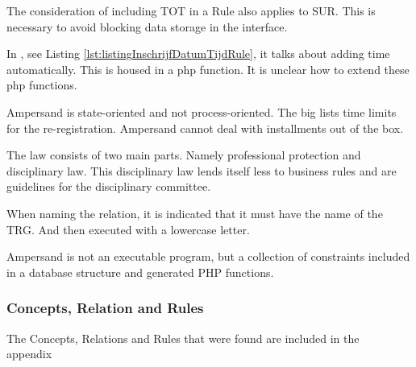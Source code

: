 The consideration of including TOT in a Rule also applies to SUR.
This is necessary to avoid blocking data storage in the interface.

In , see Listing \ref{lst:listingInschrijfDatumTijdRule}, it talks about adding time automatically.
This is housed in a php function.
It is unclear how to extend these php functions.

Ampersand is state-oriented and not process-oriented.
The \acrshort{big} lists time limits for the re-registration.
Ampersand cannot deal with installments out of the box.

The law consists of two main parts.
Namely professional protection and disciplinary law.
This disciplinary law lends itself less to business rules and are guidelines for the disciplinary committee.

When naming the relation, it is indicated that it must have the name of the TRG.
And then executed with a lowercase letter.

Ampersand is not an executable program, but a collection of constraints included in a database structure and generated PHP functions.


\subsubsection{Concepts, Relation and Rules}
The Concepts, Relations and Rules that were found are included in the appendix~